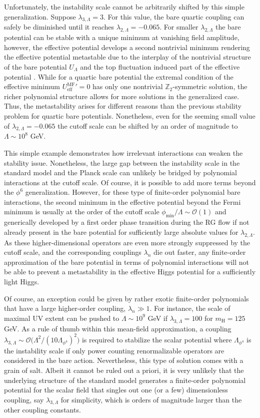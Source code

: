 \documentclass[twocolumn,aps,prd,showpacs,nofootinbib,superscriptaddress,preprintnumbers,floatfix,10pt]{revtex4-1}
\newcommand{\UL}{U_{\Lambda}}
\newcommand{\lL}{\lambda_{2,\Lambda}}
\newcommand{\mH}{m_{\text{H}}}
\newcommand{\UMF}{U^{\mathrm{MF}}_{\mathrm{eff}}}
\begin{document}
Unfortunately, the instability scale cannot be arbitrarily shifted by this simple generalization. Suppose $\lambda_{3,\Lambda} = 3$. For this value, the bare quartic coupling can safely be diminished until it reaches $\lL = -0.065$. For smaller $\lL$ the bare potential can be stable with a unique minimum at vanishing field amplitude, however, the effective potential develops a second nontrivial minimum rendering the effective potential metastable due to the interplay of the nontrivial structure of the bare potential $\UL$ and the top fluctuation induced part of the effective potential \cite{Borchardt:2016xju}. While for a quartic bare potential the extremal condition of the effective minimum ${\UMF}'=0$ has only one nontrivial $\mathbb{Z}_{2}$-symmetric solution, the richer polynomial structure allows for more solutions in the generalized case.
Thus, the metastability arises for different reasons than the previous stability problem for quartic bare potentials.
Nonetheless, even for the seeming small value of $\lL=-0.065$ the cutoff scale can be shifted by an order of magnitude to $\Lambda \sim 10^{8}$ GeV.


This simple example demonstrates how irrelevant interactions can weaken the stability issue. Nonetheless, the large gap between the instability scale in the standard model and the Planck scale can unlikely be bridged by polynomial interactions at the cutoff scale. Of course, it is possible to add more terms beyond the $\phi^{6}$ generalization. However, for these type of finite-order polynomial bare interactions, the second minimum in the effective potential beyond the Fermi minimum is usually at the order of the cutoff scale $\phi_{\mathrm{min}}/\Lambda \sim \mathcal{O}(1)$ and generically developed by a first order phase transition during the RG flow if not already present in the bare potential for sufficiently large absolute values for $\lL$. As these higher-dimensional operators are even more strongly suppressed by the cutoff scale, and the corresponding couplings $\lambda_{n}$ die out faster, any finite-order approximation of the bare potential in terms of polynomial interactions will not be able to prevent a metastability in the effective Higgs potential for a sufficiently light Higgs. 


Of course, an exception could be given by rather exotic finite-order polynomials that have a large higher-order coupling, $\lambda_{n}\gg 1$. For instance, the scale of maximal UV extent can be pushed to $\Lambda \sim 10^{9}$ GeV if $\lambda_{3,\Lambda} = 100$ for $\mH = 125$ GeV. 
As a rule of thumb within this mean-field approximation, a coupling $\lambda_{3,\Lambda} \sim \mathcal{O}\big(\Lambda^{2}/(10\Lambda_{\phi^{4}})^{2}\big)$ is required to stabilize the scalar potential where $\Lambda_{\phi^{4}}$ is the instability scale if only power counting renormalizable operators are considered in the bare action. 
Nevertheless, this type of solution comes with a grain of salt. Albeit it cannot be ruled out a priori, it is very unlikely that the underlying structure of the standard model generates a finite-order polynomial potential for the scalar field that singles out one (or a few) dimensionless coupling, say $\lambda_{3,\Lambda}$ for simplicity, which is orders of magnitude larger than the other coupling constants. 
\end{document}
